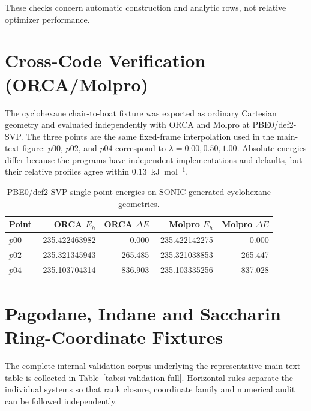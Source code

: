 \documentclass[10pt]{article}
\begin{document}
These checks concern automatic construction and analytic rows, not relative
optimizer performance.

\section{Cross-Code Verification (ORCA/Molpro)}

The cyclohexane chair-to-boat fixture was exported as ordinary Cartesian
geometry and evaluated independently with ORCA and Molpro at PBE0/def2-SVP.
The three points are the same fixed-frame interpolation used in the main-text
figure: \(p00\), \(p02\), and \(p04\) correspond to
\(\lambda=0.00,0.50,1.00\).  Absolute energies differ because the programs
have independent implementations and defaults, but their relative profiles
agree within 0.13~kJ~mol\(^{-1}\).

\begin{table}[htbp]
\centering
\caption{PBE0/def2-SVP single-point energies on SONIC-generated cyclohexane geometries.}
\begin{tabular}{@{}lrrrr@{}}
\toprule
Point & ORCA \(E_h\) & ORCA \(\Delta E\) & Molpro \(E_h\) & Molpro \(\Delta E\) \\
\midrule
\(p00\) & -235.422463982 & 0.000 & -235.422142275 & 0.000 \\
\(p02\) & -235.321345943 & 265.485 & -235.321038853 & 265.447 \\
\(p04\) & -235.103704314 & 836.903 & -235.103335256 & 837.028 \\
\bottomrule
\end{tabular}
\end{table}

\section{Pagodane, Indane and Saccharin Ring-Coordinate Fixtures}

The complete internal validation corpus underlying the representative
main-text table is collected in Table~\ref{tab:si-validation-full}.
Horizontal rules separate the individual systems so that rank closure,
coordinate family and numerical audit can be followed independently.
\end{document}

